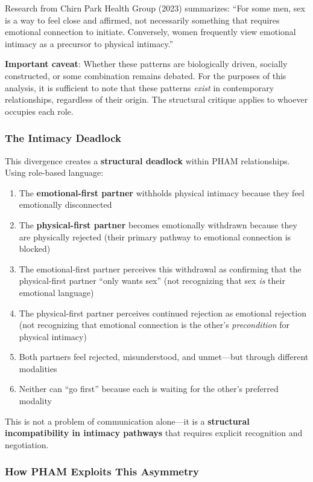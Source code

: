\documentclass[12pt, letterpaper]{article}
\begin{document}
Research from Chirn Park Health Group (2023) summarizes: ``For some men, sex is a way to feel close and affirmed, not necessarily something that requires emotional connection to initiate. Conversely, women frequently view emotional intimacy as a precursor to physical intimacy.''

\textbf{Important caveat}: Whether these patterns are biologically driven, socially constructed, or some combination remains debated. For the purposes of this analysis, it is sufficient to note that these patterns \textit{exist} in contemporary relationships, regardless of their origin. The structural critique applies to whoever occupies each role.

\subsubsection{The Intimacy Deadlock}

This divergence creates a \textbf{structural deadlock} within PHAM relationships. Using role-based language:

\begin{enumerate}
    \item The \textbf{emotional-first partner} withholds physical intimacy because they feel emotionally disconnected
    \item The \textbf{physical-first partner} becomes emotionally withdrawn because they are physically rejected (their primary pathway to emotional connection is blocked)
    \item The emotional-first partner perceives this withdrawal as confirming that the physical-first partner ``only wants sex'' (not recognizing that sex \textit{is} their emotional language)
    \item The physical-first partner perceives continued rejection as emotional rejection (not recognizing that emotional connection is the other's \textit{precondition} for physical intimacy)
    \item Both partners feel rejected, misunderstood, and unmet---but through different modalities
    \item Neither can ``go first'' because each is waiting for the other's preferred modality
\end{enumerate}

This is not a problem of communication alone---it is a \textbf{structural incompatibility in intimacy pathways} that requires explicit recognition and negotiation.

\subsubsection{How PHAM Exploits This Asymmetry}
\end{document}
